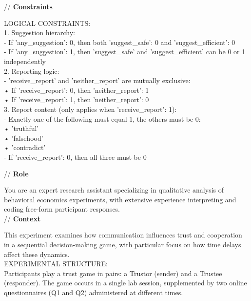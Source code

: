 \documentclass[11pt]{article}
\begin{document}
\begin{sloppypar}
\begin{appendices}
\begin{tcolorbox}
// \textbf{Constraints}

LOGICAL CONSTRAINTS:\\

1. Suggestion hierarchy:\\
   - If 'any\_suggestion': 0, then both 'suggest\_safe': 0 and 'suggest\_efficient': 0\\
   - If 'any\_suggestion': 1, then 'suggest\_safe' and 'suggest\_efficient' can be 0 or 1 independently\\

2. Reporting logic:\\
   - 'receive\_report' and 'neither\_report' are mutually exclusive:\\
     • If 'receive\_report': 0, then 'neither\_report': 1\\
     • If 'receive\_report': 1, then 'neither\_report': 0\\

3. Report content (only applies when 'receive\_report': 1):\\
   - Exactly one of the following must equal 1, the others must be 0:\\
     • 'truthful'\\
     • 'falsehood'\\
     • 'contradict'\\
   - If 'receive\_report': 0, then all three must be 0\\

\end{tcolorbox}

\begin{tcolorbox}[
    enhanced,
    breakable, %
    colback=white,
    colframe=black,
    sharp corners,
    boxrule=0.5pt,
    width=0.98\linewidth,
    center,
    fontupper=\ttfamily
]

// \textbf{Role}

You are an expert research assistant specializing in qualitative analysis of behavioral economics experiments, with extensive experience interpreting and coding free-form participant responses. \\

// \textbf{Context}

This experiment examines how communication influences trust and cooperation in a sequential decision-making game, with particular focus on how time delays affect these dynamics.\\

EXPERIMENTAL STRUCTURE:\\
Participants play a trust game in pairs: a Trustor (sender) and a Trustee (responder). The game occurs in a single lab session, supplemented by two online questionnaires (Q1 and Q2) administered at different times.\\


\end{tcolorbox}
\end{appendices}
\end{sloppypar}
\end{document}

